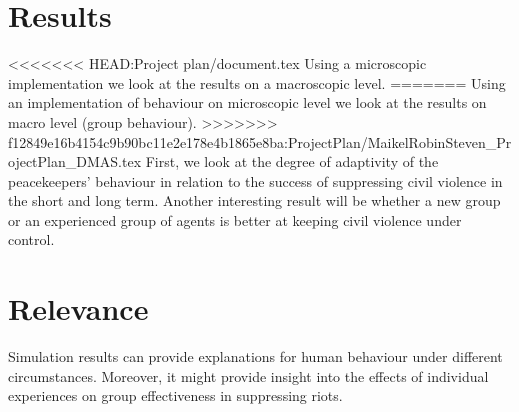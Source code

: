 \documentclass[11pt,a4paper]{article}
\begin{document}
	\section{Results}
<<<<<<< HEAD:Project plan/document.tex
		Using a microscopic implementation we look at the results on a macroscopic level.
=======
		Using an implementation of behaviour on microscopic level we look at the results on macro level (group behaviour).
>>>>>>> f12849e16b4154c9b90bc11e2e178e4b1865e8ba:ProjectPlan/MaikelRobinSteven_ProjectPlan_DMAS.tex
		First, we look at the degree of adaptivity of the peacekeepers' behaviour in relation to the success of suppressing civil violence in the short and long term. 
		Another interesting result will be whether a new group or an experienced group of agents is better at keeping civil violence under control.
		
	\section{Relevance}
		Simulation results can provide explanations for human behaviour under different circumstances. Moreover, it might provide insight into the effects of individual experiences on group effectiveness in suppressing riots.
		
	
	
\end{document}
